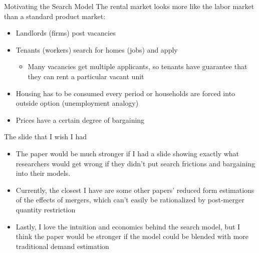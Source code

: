 \documentclass[10pt, xcolor=dvipsnames]{beamer}
\begin{document}
\begin{frame}{Motivating the Search Model}\label{slide:searchmotivation}
The rental market looks more like the labor market than a standard product market:\\
    \begin{itemize}
        \item Landlords (firms) post vacancies
        \item Tenants (workers) search for homes (jobs) and apply
        \begin{itemize}
            \item Many vacancies get multiple applicants, so tenants have guarantee that they can rent a particular vacant unit
        \end{itemize}
        \item Housing has to be consumed every period or households are forced into outside option (unemployment analogy)
        \item Prices have a certain degree of bargaining
    \end{itemize}

    \hyperlink{slide:fern-prices}{}
    
\end{frame}

\begin{frame}{The slide that I wish I had}

\begin{itemize}
    \item The paper would be much stronger if I had a slide showing exactly what researchers would get wrong if they didn't put search frictions and bargaining into their models.
    \item Currently, the closest I have are some other papers' reduced form estimations of the effects of mergers, which can't easily be rationalized by post-merger quantity restriction
    \item Lastly, I love the intuition and economics behind the search model, but I think the paper would be stronger if the model could be blended with more traditional demand estimation
\end{itemize}
    
\end{frame}


    
\end{document}
